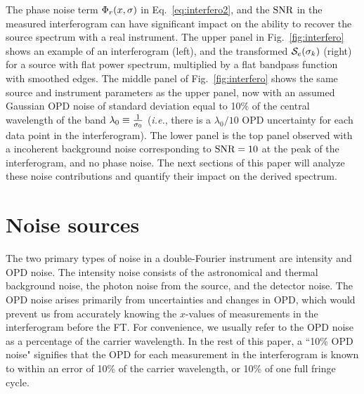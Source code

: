 The phase noise term $\Phi_r(x,\sigma)$ in Eq.~\ref{eq:interfero2}, and the $\textrm{SNR}$ in the measured interferogram can have significant
impact on the ability to recover the source spectrum with a real instrument. The upper panel in Fig.~\ref{fig:interfero} shows an example of an interferogram (left), and the transformed $\mathcal{S}_e(\sigma_k)$ (right) for a source with flat power spectrum, multiplied by a flat bandpass function with smoothed edges.
 The middle panel of Fig.~\ref{fig:interfero} shows
the same source and instrument parameters as the upper panel, now with an assumed Gaussian OPD noise of standard deviation equal to 10\% of the central wavelength of the band $\lambda_0\equiv {1\over\sigma_0}$ (\textit{i.e.}, there is a $\lambda_0/10$ OPD uncertainty for each data point in the interferogram). The lower panel is the top panel observed with a incoherent background noise corresponding to $\textrm{SNR}=10$ at the peak of the interferogram, and no phase noise. 
The next sections of this paper will analyze these noise contributions and quantify their impact on the derived spectrum.

\section{Noise sources}
The two primary types of noise in a double-Fourier instrument are intensity and OPD noise. The intensity
noise consists of the astronomical and thermal background noise, the photon noise from the source, and the detector noise. The OPD noise arises primarily from uncertainties and changes in OPD, which would prevent us from accurately knowing the $x$-values of measurements in the interferogram before the FT. For convenience, we usually refer to the OPD noise as a percentage of the carrier wavelength. In the rest of this paper, a ``10\% OPD noise" signifies that the OPD for each measurement in the interferogram is known to within an error of 10\% of the carrier wavelength, or 10\% of one full fringe cycle.

